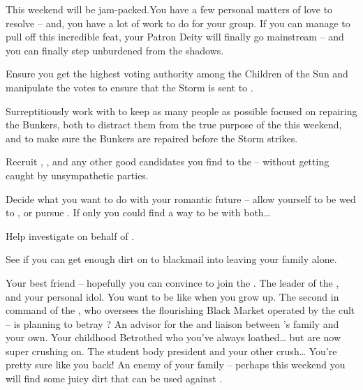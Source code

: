 \documentclass[char]{GL2020}
\begin{document}
This weekend will be jam-packed.You have a few personal matters of love to resolve -- and, you have a lot of work to do for your group. If you can manage to pull off this incredible feat, your Patron Deity will finally go mainstream -- and you can finally step unburdened from the shadows.
 
\begin{itemz}
	\item Ensure you get the highest voting authority among the Children of the Sun and manipulate the votes to ensure that the Storm is sent to \pSc{}.
	\item Surreptitiously work with \cChupSecond{} to keep as many people as possible focused on repairing the Bunkers, both to distract them from the true purpose of the \pGoaties{} this weekend, and to make sure the Bunkers are repaired before the Storm strikes.
	\item Recruit \cAmbition{}, \cHeir{}, and any other good candidates you find to the \pGoaties{} -- without getting caught by unsympathetic parties.
	\item Decide what you want to do with your romantic future -- allow yourself to be wed to \cHeir{}, or pursue \cPresident{}. If only you could find a way to be with both\ldots{}
	\item Help investigate \cChupSecond{} on behalf of \cChupLeader{}.
	\item See if you can get enough dirt on \cEvil{} to blackmail \cEvil{\them} into leaving your family alone.
\end{itemz}
 
\begin{itemz}[Notes]
	\item 
\end{itemz}
 
\begin{contacts}
	\contact{\cAmbition{}} Your best friend -- hopefully you can convince \cAmbition{\them} to join the \pGoaties{}.
	\contact{\cChupLeader{}} The leader of the \pGoaties{}, and your personal idol. You want to be like \cChupLeader{\them} when you grow up.
	\contact{\cChupSecond{}} The second in command of the \pGoaties{}, who oversees the flourishing Black Market operated by the cult -- is \cChupSecond{} planning to betray \cChupLeader{}?
	\contact{\cDiplomat{}} An advisor for the \pTech{} and liaison between \cHeir{}'s family and your own.
	\contact{\cHeir{}} Your childhood Betrothed who you've always loathed\ldots{} but are now super crushing on.
	\contact{\cPresident{}} The student body president and your other crush\ldots{} You're pretty sure  like you back!
	\contact{\cEvil{}} An enemy of your family -- perhaps this weekend you will find some juicy dirt that can be used against \cEvil{\them}.
 
\end{contacts}
 
\end{document}
